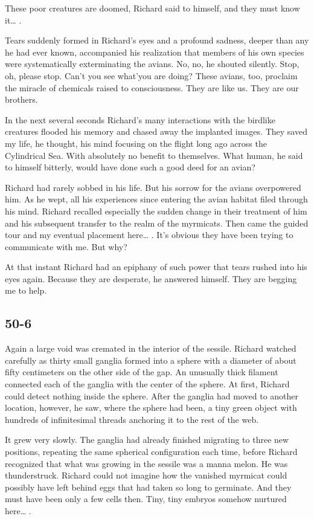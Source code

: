 \documentclass[]{article}
\begin{document}
{{These poor creatures are doomed, Richard said to himself, and they must know it… .

Tears suddenly formed in Richard’s eyes and a profound sadness, deeper than any he had ever known, accompanied his realization that members of his own species were systematically exterminating the avians. No, no, he shouted silently. Stop, oh, please stop. Can’t you see what’you are doing? These avians, too, proclaim the miracle of chemicals raised to consciousness. They are like us. They are our brothers.

In the next several seconds Richard’s many interactions with the birdlike creatures flooded his memory and chased away the implanted images. They saved my life, he thought, his mind focusing on the flight long ago across the Cylindrical Sea. With absolutely no benefit to themselves. What human, he said to himself bitterly, would have done such a good deed for an avian?

Richard had rarely sobbed in his life. But his sorrow for the avians overpowered him. As he wept, all his experiences since entering the avian habitat filed through his mind. Richard recalled especially the sudden change in their treatment of him and his subsequent transfer to the realm of the myrmicats. Then came the guided tour and my eventual placement here… . It’s obvious they have been trying to communicate with me. But why?

At that instant Richard had an epiphany of such power that tears rushed into his eyes again. Because they are desperate, he answered himself. They are begging me to help.



\subsection{50-6}

Again a large void was cremated in the interior of the sessile. Richard watched carefully as thirty small ganglia formed into a sphere with a diameter of about fifty centimeters on the other side of the gap. An unusually thick filament connected each of the ganglia with the center of the sphere. At first, Richard could detect nothing inside the sphere. After the ganglia had moved to another location, however, he saw, where the sphere had been, a tiny green object with hundreds of infinitesimal threads anchoring it to the rest of the web.

It grew very slowly. The ganglia had already finished migrating to three new positions, repeating the same spherical configuration each time, before Richard recognized that what was growing in the sessile was a manna melon. He was thunderstruck. Richard could not imagine how the vanished myrmicat could possibly have left behind eggs that had taken so long to germinate. And they must have been only a few cells then. Tiny, tiny embryos somehow nurtured here… .

}}
\end{document}
